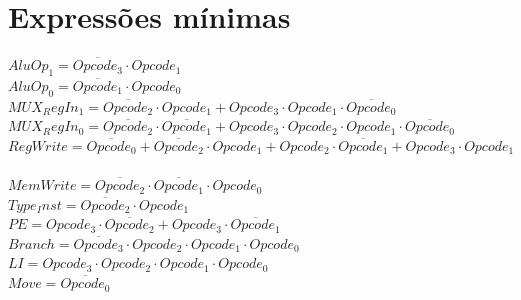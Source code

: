 \documentclass [15pt,a4paper,twoside]{article}
\begin{document}
\section{Expressões mínimas}
$AluOp_{1} =  \overline{Opcode_{3}}  \cdot Opcode_{1}$~\\
$AluOp_{0} =  \overline{Opcode_{1}}  \cdot Opcode_{0}$~\\
$MUX_RegIn_{1} =  \overline{Opcode_{2}}  \cdot Opcode_{1}+Opcode_{3} \cdot Opcode_{1} \cdot  \overline{Opcode_{0}} $~\\
$MUX_RegIn_{0} =  \overline{Opcode_{2}}  \cdot  \overline{Opcode_{1}} +Opcode_{3} \cdot Opcode_{2} \cdot Opcode_{1} \cdot  \overline{Opcode_{0}} $~\\
$RegWrite =  \overline{Opcode_{0}} + \overline{Opcode_{2}}  \cdot Opcode_{1}+Opcode_{2} \cdot  \overline{Opcode_{1}} +Opcode_{3} \cdot Opcode_{1}$~\\
$MemWrite =  \overline{Opcode_{2}}  \cdot  \overline{Opcode_{1}}  \cdot Opcode_{0}$~\\
$Type_Inst =  \overline{Opcode_{2}}  \cdot Opcode_{1}$~\\
$PE = Opcode_{3} \cdot  \overline{Opcode_{2}} +Opcode_{3} \cdot  \overline{Opcode_{1}} $~\\
$Branch =  \overline{Opcode_{3}}  \cdot Opcode_{2} \cdot Opcode_{1} \cdot Opcode_{0}$~\\
$LI = Opcode_{3} \cdot Opcode_{2} \cdot Opcode_{1} \cdot Opcode_{0}$~\\
$Move =  \overline{Opcode_{0}} $~\\
\end{document}
